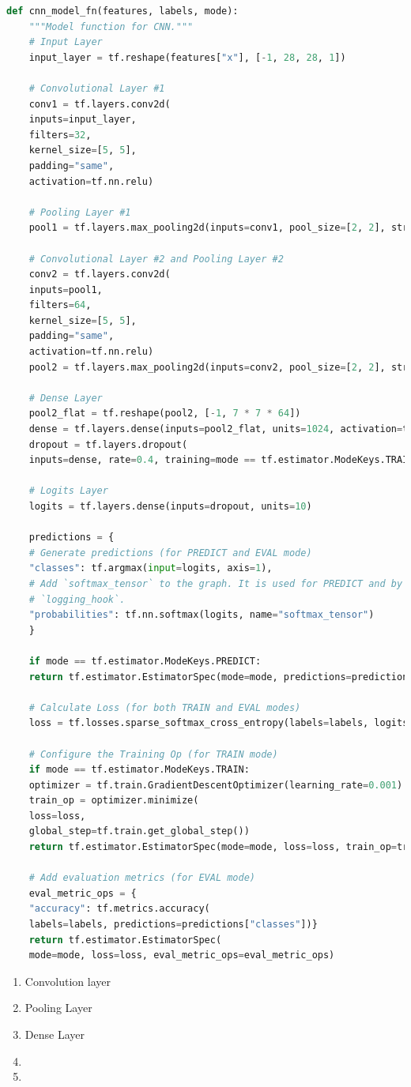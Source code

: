 \begin{lstlisting}[language=Python, caption=Simple CNN  implementation using Tensorflow in Python \cite{abadi2016tensorflow}]
	def cnn_model_fn(features, labels, mode):
	"""Model function for CNN."""
	# Input Layer
	input_layer = tf.reshape(features["x"], [-1, 28, 28, 1])
	
	# Convolutional Layer #1
	conv1 = tf.layers.conv2d(
	inputs=input_layer,
	filters=32,
	kernel_size=[5, 5],
	padding="same",
	activation=tf.nn.relu)
	
	# Pooling Layer #1
	pool1 = tf.layers.max_pooling2d(inputs=conv1, pool_size=[2, 2], strides=2)
	
	# Convolutional Layer #2 and Pooling Layer #2
	conv2 = tf.layers.conv2d(
	inputs=pool1,
	filters=64,
	kernel_size=[5, 5],
	padding="same",
	activation=tf.nn.relu)
	pool2 = tf.layers.max_pooling2d(inputs=conv2, pool_size=[2, 2], strides=2)
	
	# Dense Layer
	pool2_flat = tf.reshape(pool2, [-1, 7 * 7 * 64])
	dense = tf.layers.dense(inputs=pool2_flat, units=1024, activation=tf.nn.relu)
	dropout = tf.layers.dropout(
	inputs=dense, rate=0.4, training=mode == tf.estimator.ModeKeys.TRAIN)
	
	# Logits Layer
	logits = tf.layers.dense(inputs=dropout, units=10)
	
	predictions = {
	# Generate predictions (for PREDICT and EVAL mode)
	"classes": tf.argmax(input=logits, axis=1),
	# Add `softmax_tensor` to the graph. It is used for PREDICT and by the
	# `logging_hook`.
	"probabilities": tf.nn.softmax(logits, name="softmax_tensor")
	}
	
	if mode == tf.estimator.ModeKeys.PREDICT:
	return tf.estimator.EstimatorSpec(mode=mode, predictions=predictions)
	
	# Calculate Loss (for both TRAIN and EVAL modes)
	loss = tf.losses.sparse_softmax_cross_entropy(labels=labels, logits=logits)
	
	# Configure the Training Op (for TRAIN mode)
	if mode == tf.estimator.ModeKeys.TRAIN:
	optimizer = tf.train.GradientDescentOptimizer(learning_rate=0.001)
	train_op = optimizer.minimize(
	loss=loss,
	global_step=tf.train.get_global_step())
	return tf.estimator.EstimatorSpec(mode=mode, loss=loss, train_op=train_op)
	
	# Add evaluation metrics (for EVAL mode)
	eval_metric_ops = {
	"accuracy": tf.metrics.accuracy(
	labels=labels, predictions=predictions["classes"])}
	return tf.estimator.EstimatorSpec(
	mode=mode, loss=loss, eval_metric_ops=eval_metric_ops)

\end{lstlisting}

\begin{enumerate}
	\item Convolution layer 
	\item Pooling Layer
	\item  Dense Layer 
	\item  
	\item 
\end{enumerate}




